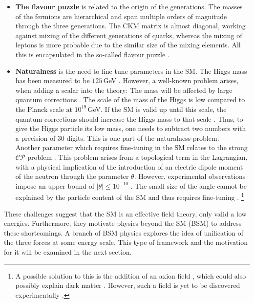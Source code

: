 \begin{itemize}
    \item \textbf{The flavour puzzle} is related to the origin of the generations. The masses of the fermions are hierarchical and span multiple orders of magnitude through the three generations. The CKM matrix is almost diagonal, working against mixing of the different generations of quarks, whereas the mixing of leptons is more probable due to the similar size of the mixing elements. All this is encapsulated in the so-called flavour puzzle \cite{Feruglio:2015jfa}. 
    \item \textbf{Naturalness} is the need to fine tune parameters in the SM. The Higgs mass has been measured to be $125\,$GeV \cite{ATLAS:2012yve,CMS:2012qbp}. However, a well-known problem arises, when adding a scalar into the theory: The mass will be affected by large quantum corrections \cite{Gaillard:1998ui}. The scale of the mass of the Higgs is low compared to the Planck scale at $10^{19}\,$GeV. If the SM is valid up until this scale, the quantum corrections should increase the Higgs mass to that scale \cite{Susskind:1978ms,Vieira:2012ex}. Thus, to give the Higgs particle its low mass, one needs to subtract two numbers with a precision of 30 digits. This is one part of the naturalness problem. \\
    Another parameter which requires fine-tuning in the SM relates to the strong $\mathcal{CP}$ problem \cite{tHooft:1976rip,tHooft:1976snw,Wilczek:1977pj}. This problem arises from a topological term in the Lagrangian, with a physical implication of the introduction of an electric dipole moment of the neutron \cite{Sannino:2026wgx} through the parameter $\theta$. However, experimental observations impose an upper bound of $|\theta|\le 10^{-10}$ \cite{Abel:2020pzs}. The small size of the angle cannot be explained by the particle content of the SM and thus requires fine-tuning \cite{Pernow:2021fvb}. \footnote{A possible solution to this is the addition of an axion field \cite{Peccei:1977hh,Peccei:1977ur,}, which could also possibly explain dark matter \cite{Preskill:1982cy, Abbott:1982af,Dine:1982ah}. However, such a field is yet to be discovered experimentally \cite{ParticleDataGroup:2024cfk}.}  
\end{itemize}

These challenges suggest that the SM is an effective field theory, only valid a low energies. Furthermore, they motivate physics beyond the SM (BSM) to address these shortcomings. A branch of BSM physics explores the idea of unification of the three forces at some energy scale. This type of framework and the motivation for it will be examined in the next section.

